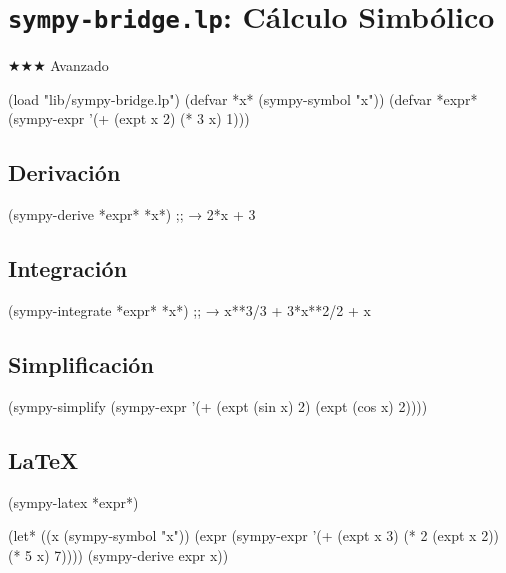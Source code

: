 \chapter{\texttt{sympy-bridge.lp}: Cálculo Simbólico}
\label{chap:sympy-bridge}
{\huge$\bigstar$}{\huge$\bigstar$}{\huge$\bigstar$} Avanzado

\begin{lispcode}
(load "lib/sympy-bridge.lp")
(defvar *x* (sympy-symbol "x"))
(defvar *expr* (sympy-expr '(+ (expt x 2) (* 3 x) 1)))
\end{lispcode}

\section{Derivación}
\begin{lispcode}
(sympy-derive *expr* *x*)  ;; → 2*x + 3
\end{lispcode}

\section{Integración}
\begin{lispcode}
(sympy-integrate *expr* *x*)  ;; → x**3/3 + 3*x**2/2 + x
\end{lispcode}

\section{Simplificación}
\begin{lispcode}
(sympy-simplify (sympy-expr '(+ (expt (sin x) 2) (expt (cos x) 2))))
\end{lispcode}

\section{LaTeX}
\begin{lispcode}
(sympy-latex *expr*)
\end{lispcode}

\begin{examplebox}[title=Derivada de polinomio]
\begin{lispcode}
(let* ((x (sympy-symbol "x"))
       (expr (sympy-expr '(+ (expt x 3) (* 2 (expt x 2)) (* 5 x) 7))))
  (sympy-derive expr x))
\end{lispcode}
\end{examplebox}

